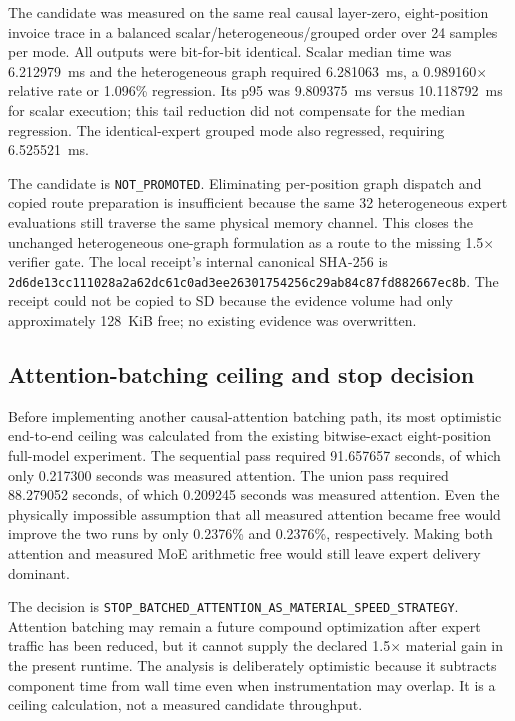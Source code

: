 The candidate was measured on the same real causal layer-zero, eight-position
invoice trace in a balanced scalar/heterogeneous/grouped order over 24 samples
per mode.  All outputs were bit-for-bit identical.  Scalar median time was
6.212979~ms and the heterogeneous graph required 6.281063~ms, a
0.989160$\times$ relative rate or 1.096\% regression.  Its p95 was
9.809375~ms versus 10.118792~ms for scalar execution; this tail reduction did
not compensate for the median regression.  The identical-expert grouped mode
also regressed, requiring 6.525521~ms.

The candidate is \texttt{NOT\_PROMOTED}.  Eliminating per-position graph
dispatch and copied route preparation is insufficient because the same 32
heterogeneous expert evaluations still traverse the same physical memory
channel.  This closes the unchanged heterogeneous one-graph formulation as a
route to the missing 1.5$\times$ verifier gate.  The local receipt's internal
canonical SHA-256 is
\texttt{2d6de13cc111028a2a62dc61c0ad3ee26301754256c29ab84c87fd882667ec8b}.
The receipt could not be copied to SD because the evidence volume had only
approximately 128~KiB free; no existing evidence was overwritten.

\subsection{Attention-batching ceiling and stop decision}

Before implementing another causal-attention batching path, its most optimistic
end-to-end ceiling was calculated from the existing bitwise-exact eight-position
full-model experiment.  The sequential pass required 91.657657 seconds, of
which only 0.217300 seconds was measured attention.  The union pass required
88.279052 seconds, of which 0.209245 seconds was measured attention.  Even the
physically impossible assumption that all measured attention became free would
improve the two runs by only 0.2376\% and 0.2376\%, respectively.  Making both
attention and measured MoE arithmetic free would still leave expert delivery
dominant.

The decision is
\texttt{STOP\_BATCHED\_ATTENTION\_AS\_MATERIAL\_SPEED\_STRATEGY}.  Attention
batching may remain a future compound optimization after expert traffic has
been reduced, but it cannot supply the declared 1.5$\times$ material gain in
the present runtime.  The analysis is deliberately optimistic because it
subtracts component time from wall time even when instrumentation may overlap.
It is a ceiling calculation, not a measured candidate throughput.

